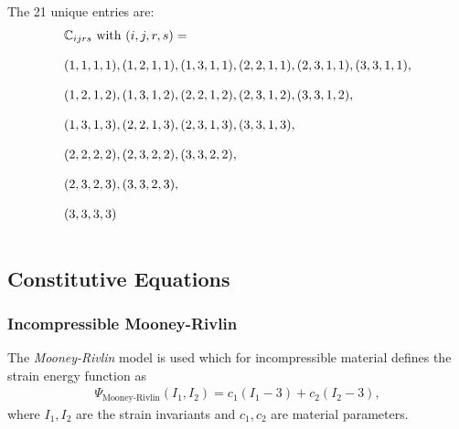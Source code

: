 The 21 unique entries are:
\begin{equation*}
  \begin{array}{lll}
    \mathbb{C}_{ijrs} \text{ with } (i,j,r,s) =\\[4mm]
    (1,1,1,1),
    (1,2,1,1),
    (1,3,1,1),
    (2,2,1,1),
    (2,3,1,1),
    (3,3,1,1),\\[4mm]
    (1,2,1,2),
    (1,3,1,2),
    (2,2,1,2),
    (2,3,1,2),
    (3,3,1,2),\\[4mm]
    (1,3,1,3),
    (2,2,1,3),
    (2,3,1,3),
    (3,3,1,3),\\[4mm]
    (2,2,2,2),
    (2,3,2,2),
    (3,3,2,2),\\[4mm]
    (2,3,2,3),
    (3,3,2,3),\\[4mm]
    (3,3,3,3)\\[4mm]
  \end{array}
\end{equation*}

\subsection{Constitutive Equations}
\subsubsection{Incompressible Mooney-Rivlin}
The \emph{Mooney-Rivlin} model is used which for incompressible material defines the strain energy function as
\begin{equation*}
  \begin{array}{lll}
    \Psi_\text{Mooney-Rivlin}(I_1, I_2) = c_1(I_1 - 3) + c_2(I_2 - 3),
  \end{array}
\end{equation*}
where $I_1, I_2$ are the strain invariants and $c_1, c_2$ are material parameters.

